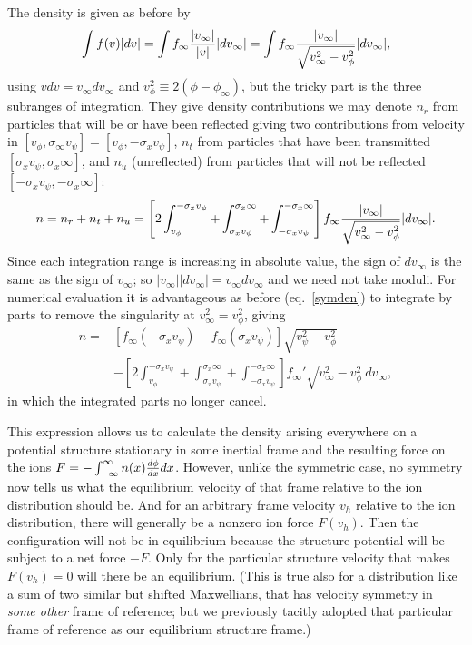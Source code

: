 \documentclass[pre]{revtex4-2}
\begin{document}
The density is given as before by 
\begin{equation}
\int f(v) |dv|=\int f_\infty {|v_\infty|\over |v|}   |dv_\infty| 
=\int  f_\infty {|v_\infty|\over \sqrt{v_\infty^2-v_\phi^2} }  |dv_\infty|, 
\end{equation}
using $vdv=v_\infty dv_\infty$ and
$v_\phi^2\equiv 2(\phi-\phi_\infty)$, but the tricky part is the three
subranges of integration. They give density contributions we may
denote $n_r$ from particles that will be or have been reflected giving two
contributions from
velocity in $[v_\phi,\sigma_\infty v_\psi]=[v_\phi,-\sigma_x v_\psi]$, $n_t$ from particles that have been
transmitted $[\sigma_xv_\psi,\sigma_x\infty]$, and $n_u$ (unreflected)
from particles that will not be reflected
$[-\sigma_xv_\psi,-\sigma_x\infty]$:
\begin{equation}
  n=n_r+n_t+n_u=\left[2\int_{v_\phi}^{-\sigma_x v_\psi}+\int_{\sigma_x v_\psi}^{\sigma_x\infty}
    +\int_{-\sigma_x v_\psi}^{-\sigma_x\infty}\right] 
  f_\infty {|v_\infty|\over \sqrt{v_\infty^2-v_\phi^2} }  |dv_\infty|.
\end{equation}
Since each integration range is increasing in absolute value, the sign
of $dv_\infty$ is the same as the sign of $v_\infty$; so
$|v_\infty||dv_\infty|= v_\infty dv_\infty$ and we need not take moduli.
For numerical evaluation it is advantageous as before (eq.\
\ref{symden}) to integrate by parts to
remove the singularity at $v_\infty^2=v_\phi^2$, giving 
\begin{equation}
\begin{split}
  n=&[f_\infty(-\sigma_xv_\psi)-f_\infty(\sigma_xv_\psi)]\sqrt{v_\psi^2-v_\phi^2}\\
  &-\left[2\int_{v_\phi}^{-\sigma_x v_\psi}+\int_{\sigma_x v_\psi}^{\sigma_x\infty}
    +\int_{-\sigma_x v_\psi}^{-\sigma_x\infty}\right]
  f_\infty'\sqrt{v_\infty^2-v_\phi^2}\, dv_\infty,
\end{split}
\end{equation}
in which the integrated parts no longer cancel.

This expression allows us to calculate the density arising everywhere
on a potential structure stationary in some inertial frame and the
resulting force on the ions
$F=-\int_{-\infty}^{\infty} n(x) {d\phi\over dx}dx$. However, unlike
the symmetric case, no symmetry now tells us what the equilibrium
velocity of that frame relative to the ion distribution should be. And
for an arbitrary frame velocity $v_h$ relative to the ion
distribution, there will generally be a nonzero ion force
$F(v_h)$. Then the configuration will not be in equilibrium because
the structure potential will be subject to a net force $-F$. Only for
the particular structure velocity that makes $F(v_h)=0$ will there be
an equilibrium.  (This is true also for a distribution like a sum of
two similar but shifted Maxwellians, that has velocity symmetry in
\emph{some other} frame of reference; but we previously tacitly
adopted that particular frame of reference as our equilibrium
structure frame.)
\end{document}
